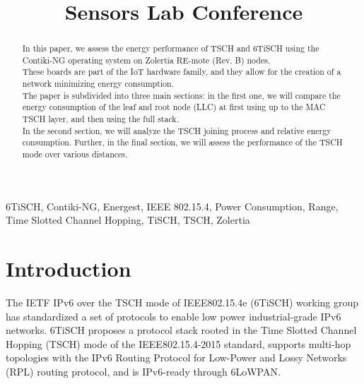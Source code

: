\documentclass[conference]{IEEEtran}
\begin{document}
\title{Sensors Lab Conference}

\author{
\and
}

\maketitle

\begin{abstract}
In this paper, we assess the energy performance of TSCH and 6TiSCH using the Contiki-NG operating system on Zolertia RE-mote (Rev. B) nodes.\\
These boards are part of the IoT hardware family, and they allow for the creation of a network minimizing energy consumption.\\
The paper is subdivided into three main sections: in the first one, we will compare the energy consumption of the leaf and root node (LLC) at first using up to the MAC TSCH layer, and then using the full stack.\\
In the second section, we will analyze the TSCH joining process and relative energy consumption. Further, in the final section, we will assess the performance of the TSCH mode over various distances.
\end{abstract}

\begin{IEEEkeywords}
6TiSCH, Contiki-NG, Energest, IEEE 802.15.4, Power Consumption, Range, Time Slotted Channel Hopping, TiSCH, TSCH, Zolertia
\end{IEEEkeywords}

\section{Introduction}
The IETF IPv6 over the TSCH mode of IEEE802.15.4e (6TiSCH) working group has standardized a set of protocols to enable low power industrial-grade IPv6 networks. 6TiSCH proposes a protocol stack rooted in the Time Slotted Channel Hopping (TSCH) mode of the IEEE802.15.4-2015 standard, supports multi-hop topologies with the IPv6 Routing Protocol for Low-Power and Lossy Networks (RPL) routing protocol, and is IPv6-ready through 6LoWPAN\cite{6tischDef}.
\end{document}
